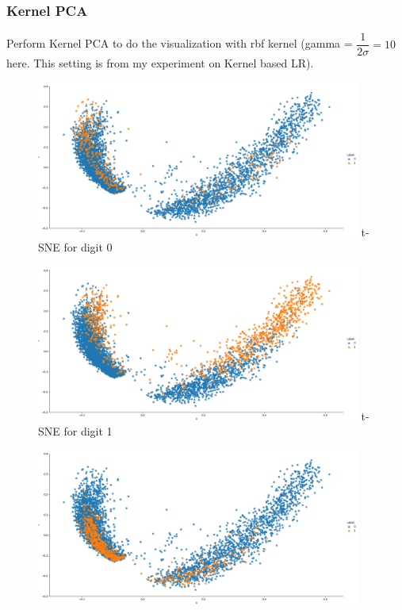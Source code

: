 \documentclass{article}
\begin{document}
\subsubsection{Kernel PCA}
Perform Kernel PCA to do the visualization with rbf kernel (gamma = $\dfrac{1}{2\sigma}=10$ here. This setting is from my experiment on Kernel based LR).
\begin{figure}[H]
    \centering
    \begin{minipage}{0.32\textwidth}
        \centering
        \includegraphics[width=0.95\textwidth]{fig/pca/kpca0.png}
        t-SNE for digit 0
    \end{minipage}
    \begin{minipage}{0.32\textwidth}
        \centering
        \includegraphics[width=0.95\textwidth]{fig/pca/kpca1.png}
        t-SNE for digit 1
    \end{minipage}
    \begin{minipage}{0.32\textwidth}
        \centering
        \includegraphics[width=0.95\textwidth]{fig/pca/kpca2.png}

\end{minipage}
\end{figure}
\end{document}
